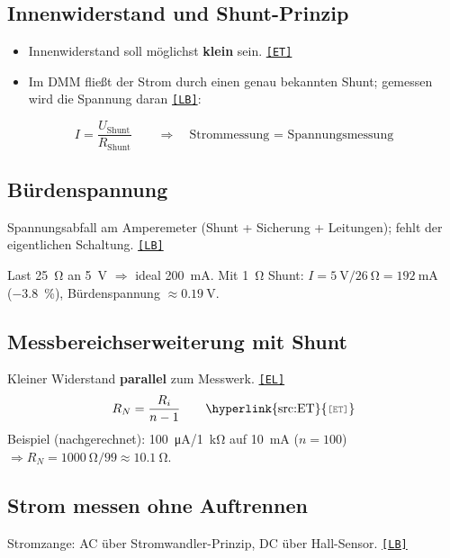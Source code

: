\documentclass[11pt,a4paper]{article}
\newcommand{\q}[1]{\hyperlink{src:#1}{\textcolor{quelle}{\texttt{\footnotesize[#1]}}}}
\begin{document}
\subsection{Innenwiderstand und Shunt-Prinzip}\label{sec:shunt}
\begin{itemize}
  \item Innenwiderstand soll möglichst \textbf{klein} sein. \q{ET}
  \item Im DMM fließt der Strom durch einen genau bekannten Shunt; gemessen wird die Spannung daran \q{LB}:
\end{itemize}
\begin{equation}\label{f:shuntI}
I=\frac{U_\text{Shunt}}{R_\text{Shunt}}\qquad\Rightarrow\quad\text{Strommessung = Spannungsmessung}
\end{equation}

\subsection{Bürdenspannung}\label{sec:buerde}
Spannungsabfall am Amperemeter (Shunt + Sicherung + Leitungen); fehlt der eigentlichen Schaltung. \q{LB}
\begin{beispiel}[(nachgerechnet)]
Last \SI{25}{\ohm} an \SI{5}{\volt} $\Rightarrow$ ideal \SI{200}{\milli\ampere}. Mit \SI{1}{\ohm} Shunt:
$I=\SI{5}{\volt}/\SI{26}{\ohm}=\SI{192}{\milli\ampere}$ (\SI{-3.8}{\percent}), Bürdenspannung $\approx\SI{0.19}{\volt}$.
\end{beispiel}

\subsection{Messbereichserweiterung mit Shunt}\label{sec:nebenwiderstand}
Kleiner Widerstand \textbf{parallel} zum Messwerk. \q{EL}
\begin{equation}\label{f:rn}
R_N=\frac{R_i}{n-1}\qquad\text{\q{ET}}
\end{equation}
Beispiel (nachgerechnet): \SI{100}{\micro\ampere}/\SI{1}{\kilo\ohm} auf \SI{10}{\milli\ampere} ($n=100$) $\Rightarrow R_N=\SI{1000}{\ohm}/99\approx\SI{10.1}{\ohm}$.

\subsection{Strom messen ohne Auftrennen}
Stromzange: AC über Stromwandler-Prinzip, DC über Hall-Sensor. \q{LB}

\end{document}
